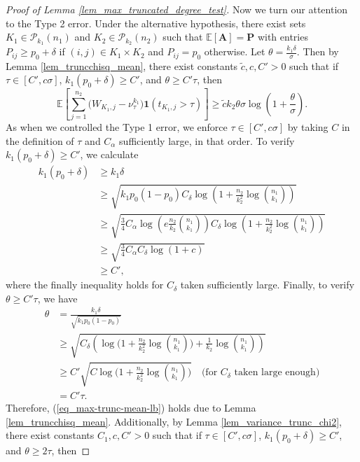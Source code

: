 \documentclass{article}
\newcommand{\A}{\mathbf{A}}
\newcommand{\bP}{\mathbf{P}}
\newcommand{\EE}{\mathbb{E}}
\newcommand{\one}{\mathbf{1}}
\begin{document}
\begin{proof}[Proof of Lemma \ref{lem_max_truncated_degree_test}]
    Now we turn our attention to the Type 2 error. Under the alternative hypothesis, there exist sets $K_1 \in \mathcal P_{k_1}(n_1)$ and $K_2 \in \mathcal P_{k_2}(n_2)$ such that $\EE[\A] = \bP$ with entries $P_{ij} \geq p_0 + \delta$ if $(i,j) \in K_1 \times K_2$ and $P_{ij} = p_0$ otherwise. Let $\theta = \frac{k_1 \delta}{\sigma}$. Then by Lemma \ref{lem_truncchisq_mean}, there exist constants $\tilde{c}, c, C' > 0$ such that if $\tau \in [C', c\sigma]$, $k_1 (p_0 + \delta) \geq C'$, and $\theta \geq C'\tau$, then
    \begin{equation}\label{eq_max-trunc-mean-lb}
    \EE\left[\sum_{j = 1}^{n_2}\big(W_{K_1,j} - \nu^{k_1}_{\tau}\big)\one(t_{K_1, j} > \tau)\right] \geq \tilde{c}k_2\theta \sigma \log\left(1 + \frac{\theta}{\sigma}\right).
    \end{equation}
    As when we controlled the Type 1 error, we enforce $\tau \in [C', c\sigma]$ by taking $C$ in the definition of $\tau$ and $C_\alpha$ sufficiently large, in that order. To verify $k_1(p_0 + \delta) \geq C'$, we calculate
    \begin{align*}
        k_1(p_0 + \delta) &\geq k_1\delta \\
        &\geq \sqrt{k_1 p_0(1-p_0)C_\delta \log\left(1 + \frac{n_2}{k_2^2}\log {n_1 \choose k_1}\right)} \\
        &\geq \sqrt{\frac34 C_\alpha\log\left(e\frac{n_2}{k_2}{n_1 \choose k_1}\right) C_\delta \log\left(1 + \frac{n_2}{k_2^2}\log {n_1 \choose k_1}\right)} \\
        &\geq \sqrt{\frac34 C_\alpha C_\delta \log\left(1 + c\right)} \\
        &\geq C',
    \end{align*}
    where the finally inequality holds for $C_\delta$ taken sufficiently large. Finally, to verify $\theta \geq C'\tau$, we have
    \begin{align*}
        \theta &= \frac{k_1\delta}{\sqrt{k_1p_0(1 - p_0)}} \\
        &\geq \sqrt{C_\delta \left(\log\Big(1 + \frac{n_2}{k_2^2}\log {n_1 \choose k_1}\Big) + \frac{1}{k_2}\log {n_1 \choose k_1}\right)} \\
        &\geq C'\sqrt{C\log\Big(1 + \frac{n_2}{k_2^2}\log {n_1 \choose k_1}\Big)} \quad \text{(for $C_\delta$ taken large enough)} \\
        &= C'\tau.
    \end{align*}
Therefore, (\ref{eq_max-trunc-mean-lb}) holds due to Lemma \ref{lem_truncchisq_mean}. Additionally, by Lemma \ref{lem_variance_trunc_chi2}, there exist constants $C_1, c, C' > 0$ such that if $\tau \in [C', c\sigma]$, $k_1 (p_0 + \delta) \geq C'$,  and $\theta \geq 2\tau$, then

\end{proof}
\end{document}
